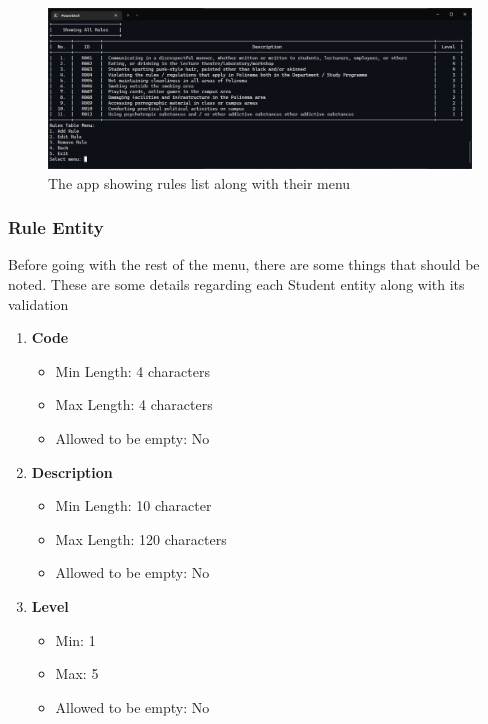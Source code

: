 \documentclass[12pt,titlepage]{article}
\begin{document}
\begin{figure}[h]
    \centering
    \includegraphics[width=\textwidth]{images/rule-menu.png}
    \caption{The app showing rules list along with their menu}
\end{figure}

\subsubsection{Rule Entity}
Before going with the rest of the menu, there are some things that should be noted.
These are some details regarding each Student entity along with its validation

\begin{enumerate}
    \item {
        \textbf{Code}
        \begin{itemize}
            \item Min Length: 4 characters
            \item Max Length: 4 characters
            \item Allowed to be empty: No
        \end{itemize}
    }
    \item {
        \textbf{Description}
        \begin{itemize}
            \item Min Length: 10 character
            \item Max Length: 120 characters
            \item Allowed to be empty: No
        \end{itemize}
    }
    \item {
        \textbf{Level}
        \begin{itemize}
            \item Min: 1
            \item Max: 5
            \item Allowed to be empty: No
        \end{itemize}
    }
\end{enumerate}
\end{document}
